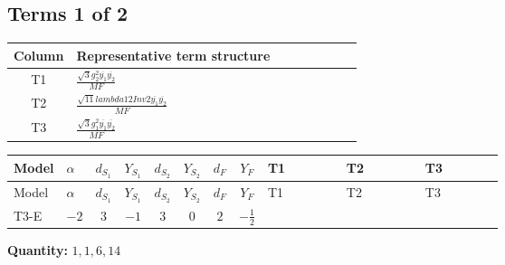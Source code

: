 \documentclass[8pt]{article}
\begin{document}
\begin{landscape}
\subsection*{Terms 1 of 2}
\begin{center}
\begin{tabular}{@{}c >{\raggedright\arraybackslash}p{0.82\linewidth}@{}}
\toprule
Column & Representative term structure \\
\midrule
T1 & \(\displaystyle \frac{\sqrt{3} g_{2}^{2} \overline{y_{1}} \overline{y_{2}}}{MF}\) \\
\midrule
T2 & \(\displaystyle \frac{\sqrt{11} lambda12Inv2 \overline{y_{1}} \overline{y_{2}}}{MF}\) \\
\midrule
T3 & \(\displaystyle \frac{\sqrt{3} g_{1}^{2} \overline{y_{1}} \overline{y_{2}}}{MF}\) \\
\midrule
\bottomrule
\end{tabular}
\end{center}
\smallskip
\tiny
\begin{longtable}{@{}llcccccc >{\raggedright\arraybackslash}p{0.21\linewidth} >{\raggedright\arraybackslash}p{0.21\linewidth} >{\raggedright\arraybackslash}p{0.21\linewidth}@{}}
\toprule
Model & $\alpha$ & $d_{S_1}$ & $Y_{S_1}$ & $d_{S_2}$ & $Y_{S_2}$ & $d_F$ & $Y_F$ & T1 & T2 & T3 \\
\midrule
\endfirsthead
\toprule
Model & $\alpha$ & $d_{S_1}$ & $Y_{S_1}$ & $d_{S_2}$ & $Y_{S_2}$ & $d_F$ & $Y_F$ & T1 & T2 & T3 \\
\midrule
\endhead
T3-E & $-2$ & $3$ & $-1$ & $3$ & $0$ & $2$ & $-\frac{1}{2}$ & \scriptsize\adjustbox{max width=\linewidth}{$\begin{gathered} - \frac{11 \sqrt{3} g_{2}^{2} \overline{y_{1}} \overline{y_{2}}}{8 MF}\end{gathered}$} & \scriptsize\adjustbox{max width=\linewidth}{$\begin{gathered} - \frac{3 \sqrt{11} lambda12Inv2 \overline{y_{1}} \overline{y_{2}}}{22 MF}\end{gathered}$} & \scriptsize\adjustbox{max width=\linewidth}{$\begin{gathered} - \frac{\sqrt{3} g_{1}^{2} \overline{y_{1}} \overline{y_{2}}}{8 MF}\end{gathered}$} \\
\midrule
\bottomrule
\end{longtable}
\clearpage
\noindent\textbf{Quantity: }$\mathrm{1,1,6,14}$\par\smallskip

\end{landscape}
\end{document}
